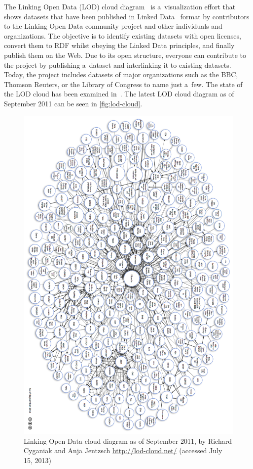 The Linking Open Data (LOD) cloud
diagram~\cite{cyganiak2011lodcloud} is a~visualization effort
that shows datasets that have been published in
Linked Data~\cite{bernerslee2006linkeddata}
format by contributors to the Linking Open Data community project
and other individuals and organizations.
The objective is to identify existing datasets with open licenses,
convert them to RDF whilst obeying the Linked Data principles,
and finally publish them on the Web.
Due to its open structure, everyone can contribute to the project by publishing a~dataset and
interlinking it to existing datasets.
Today, the project includes datasets of major organizations
such as the BBC, Thomson Reuters, or the Library of Congress
to name just a~few.
The state of the LOD cloud has been examined
in~\cite{bizer2011statelodcloud}.
The latest LOD cloud diagram as of September 2011 can be seen in \autoref{fig:lod-cloud}.

\begin{figure}[!ht]
\centering  \includegraphics[height=0.8\textheight,keepaspectratio]{lod-cloud.png}
  \caption[Linking Open Data cloud diagram as of September 2011]
  {Linking Open Data cloud diagram as of September 2011, by Richard Cyganiak and Anja Jentzsch \url{http://lod-cloud.net/} (accessed July 15, 2013) }
  \label{fig:lod-cloud}
\end{figure}

